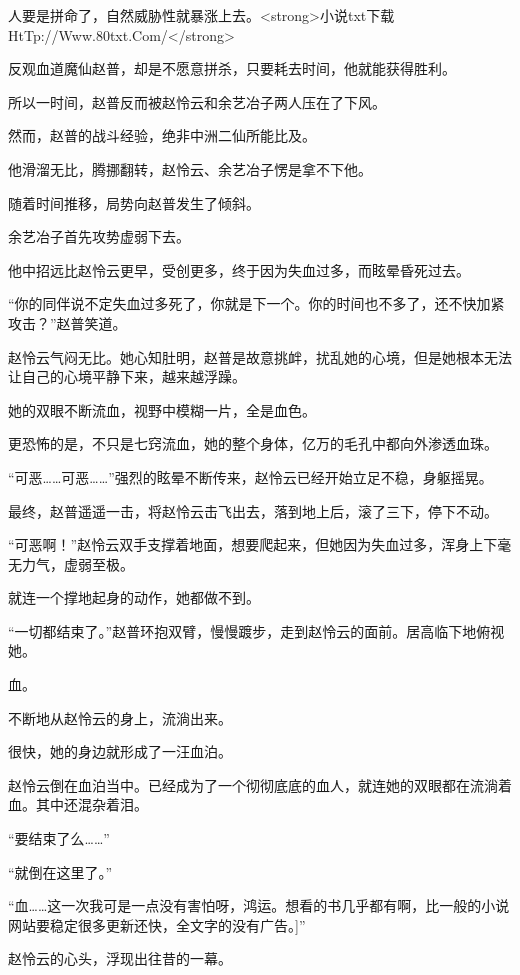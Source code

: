 
\begin{this_body}

人要是拼命了，自然威胁性就暴涨上去。<strong>小说txt下载HtTp://Www.80txt.Com/</strong>

反观血道魔仙赵普，却是不愿意拼杀，只要耗去时间，他就能获得胜利。

所以一时间，赵普反而被赵怜云和余艺冶子两人压在了下风。

然而，赵普的战斗经验，绝非中洲二仙所能比及。

他滑溜无比，腾挪翻转，赵怜云、余艺冶子愣是拿不下他。

随着时间推移，局势向赵普发生了倾斜。

余艺冶子首先攻势虚弱下去。

他中招远比赵怜云更早，受创更多，终于因为失血过多，而眩晕昏死过去。

“你的同伴说不定失血过多死了，你就是下一个。你的时间也不多了，还不快加紧攻击？”赵普笑道。

赵怜云气闷无比。她心知肚明，赵普是故意挑衅，扰乱她的心境，但是她根本无法让自己的心境平静下来，越来越浮躁。

她的双眼不断流血，视野中模糊一片，全是血色。

更恐怖的是，不只是七窍流血，她的整个身体，亿万的毛孔中都向外渗透血珠。

“可恶……可恶……”强烈的眩晕不断传来，赵怜云已经开始立足不稳，身躯摇晃。

最终，赵普遥遥一击，将赵怜云击飞出去，落到地上后，滚了三下，停下不动。

“可恶啊！”赵怜云双手支撑着地面，想要爬起来，但她因为失血过多，浑身上下毫无力气，虚弱至极。

就连一个撑地起身的动作，她都做不到。

“一切都结束了。”赵普环抱双臂，慢慢踱步，走到赵怜云的面前。居高临下地俯视她。

血。

不断地从赵怜云的身上，流淌出来。

很快，她的身边就形成了一汪血泊。

赵怜云倒在血泊当中。已经成为了一个彻彻底底的血人，就连她的双眼都在流淌着血。其中还混杂着泪。

“要结束了么……”

“就倒在这里了。”

“血……这一次我可是一点没有害怕呀，鸿运。想看的书几乎都有啊，比一般的小说网站要稳定很多更新还快，全文字的没有广告。]”

赵怜云的心头，浮现出往昔的一幕。


\end{this_body}
